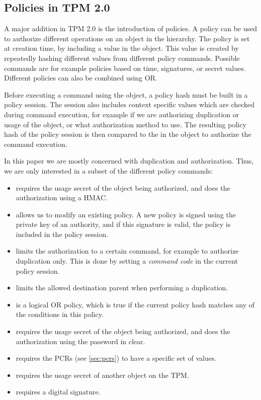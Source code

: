{\subsection{Policies in TPM 2.0}
A major addition in TPM 2.0 is the introduction of policies. A policy can be used to authorize different operations on an object in the hierarchy. The policy is set at creation time, by including a value  in the object. This value is created by repeatedly hashing different values from different policy commands. Possible commands are for example policies based on time, signatures, or secret values. Different policies can also be combined using OR.

Before executing a command using the object, a policy hash must be built in a policy session. The session also includes context specific values which are checked during command execution, for example if we are authorizing duplication or usage of the object, or what authorization method to use. The resulting policy hash of the policy session is then compared to the  in the object to authorize the command execution.

In this paper we are mostly concerned with duplication and authorization. Thus, we are only interested in a subset of the different policy commands:

\begin{itemize}
	\item {} requires the usage secret of the object being authorized, and does the authorization using a HMAC.
	\item {} allows us to modify an existing policy. A new policy is signed using the private key of an authority, and if this signature is valid, the policy is included in the policy session.
	\item {} limits the authorization to a certain command, for example to authorize duplication only. This is done by setting a \emph{command code} in the current policy session.
	\item {} limits the allowed destination parent when performing a duplication.
	\item {} is a logical OR policy, which is true if the current policy hash matches any of the conditions in this policy.
	\item {} requires the usage secret of the object being authorized, and does the authorization using the password in clear.
	\item {} requires the PCRs (see \autoref{sec:pcrs}) to have a specific set of values.
	\item {} requires the usage secret of another object on the TPM.
	\item {} requires a digital signature.
\end{itemize}

}
